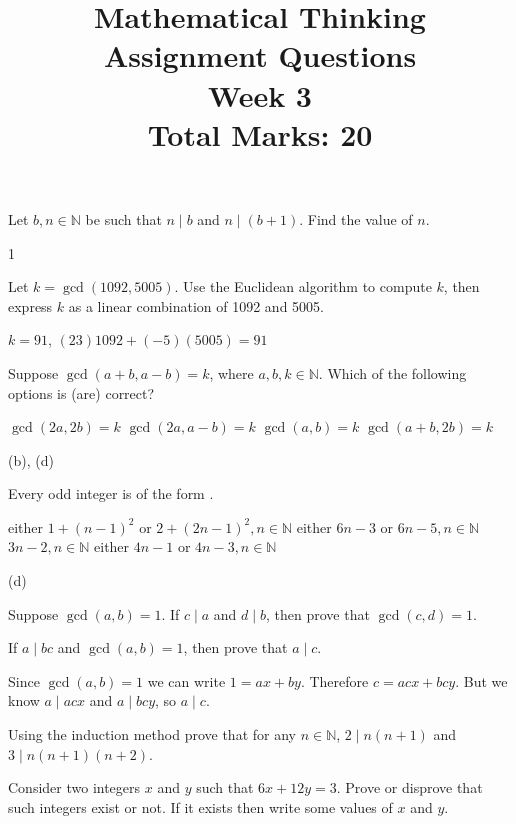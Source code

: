 \documentclass[12pt, answers, a4paper]{exam}
\title{\begin{framed}
    \textbf{Mathematical Thinking}\\Assignment Questions\\Week 3\\\normalsize{Total Marks: 20}
\end{framed}}
\date{}
\begin{document}
\maketitle

\setlength{\rightpointsmargin}{5pt}
\marginpointname{ \points}
\marksnotpoints
{}
\pointsinrightmargin

\unframedsolutions

\begin{questions}

\question  Let $b, n \in \mathbb{N}$ be such that $n \mid b$ and $n\mid (b+1).$ Find the value of $n$. 
\printanswers
\begin{solution}
    1
\end{solution}    

\question Let $k = \gcd(1092,5005).$ Use the Euclidean algorithm to compute $k$, then express $k$ as a linear combination of 1092 and 5005.
\printanswers
\begin{solution}
    $k =91$, $(23)1092 + (-5)(5005) = 91$
\end{solution}

\question Suppose $\gcd(a+b,a-b) = k$, where $a,b,k \in \mathbb{N}$. Which of the following options is (are) correct?
\begin{choices}
    \choice $\gcd(2a,2b) = k$
    \choice $\gcd(2a,a-b) = k$
    \choice $\gcd(a,b) = k$
    \choice $\gcd(a+b,2b) = k$
\end{choices}
\begin{solution}
    (b), (d)
\end{solution}

\question Every odd integer is of the form \fillin.
\begin{choices}
    \choice either $1 + (n-1)^2$ or $2+ (2n-1)^2, n \in \mathbb{N}$ 
    \choice either $6n-3$ or $6n-5, n \in \mathbb{N}$
    \choice $3n-2, n \in \mathbb{N}$
    \choice either $4n-1$ or $4n-3, n \in \mathbb{N}$
\end{choices}
\begin{solution}
    (d)
\end{solution}

\question[2] Suppose $\gcd(a,b) = 1$. If $c\mid a$ and $d\mid b$, then prove that $\gcd(c,d) = 1$.

\question[2]  If $a\mid bc$ and $\gcd(a,b) = 1$, then prove that $a\mid c$.
\noprintanswers
\begin{solution}
Since $\gcd(a, b) = 1$ we can write $1 = ax + by$. Therefore $c = acx + bcy$. But we know $a\mid acx$ and $a\mid bcy$, so $a\mid c$.    
\end{solution}





\question Using the induction method  prove that for any $n \in \mathbb{N}$, $2\mid n(n+1)$ and $3 \mid n(n+1)(n+2)$.

\question Consider two integers $x$ and $y$ such that $6x+12y=3$. Prove or disprove that such integers exist or not. If it exists then write some values of $x$ and $y$.
\end{questions}
\end{document}
